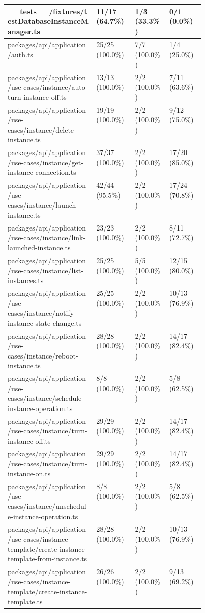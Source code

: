 \begin{longtable}{@{\extracolsep{\fill}}p{0.45\linewidth}lll}
\_\_tests\_\_/fixtures/testDatabaseInstanceManager.ts & 11/17 (64.7\%) & 1/3 (33.3\%) & 0/1 (0.0\%) \\ \hline
packages/api/application/auth.ts & 25/25 (100.0\%) & 7/7 (100.0\%) & 1/4 (25.0\%) \\ \hline
packages/api/application/use-cases/instance/auto-turn-instance-off.ts & 13/13 (100.0\%) & 2/2 (100.0\%) & 7/11 (63.6\%) \\ \hline
packages/api/application/use-cases/instance/delete-instance.ts & 19/19 (100.0\%) & 2/2 (100.0\%) & 9/12 (75.0\%) \\ \hline
packages/api/application/use-cases/instance/get-instance-connection.ts & 37/37 (100.0\%) & 2/2 (100.0\%) & 17/20 (85.0\%) \\ \hline
packages/api/application/use-cases/instance/launch-instance.ts & 42/44 (95.5\%) & 2/2 (100.0\%) & 17/24 (70.8\%) \\ \hline
packages/api/application/use-cases/instance/link-launched-instance.ts & 23/23 (100.0\%) & 2/2 (100.0\%) & 8/11 (72.7\%) \\ \hline
packages/api/application/use-cases/instance/list-instances.ts & 25/25 (100.0\%) & 5/5 (100.0\%) & 12/15 (80.0\%) \\ \hline
packages/api/application/use-cases/instance/notify-instance-state-change.ts & 25/25 (100.0\%) & 2/2 (100.0\%) & 10/13 (76.9\%) \\ \hline
packages/api/application/use-cases/instance/reboot-instance.ts & 28/28 (100.0\%) & 2/2 (100.0\%) & 14/17 (82.4\%) \\ \hline
packages/api/application/use-cases/instance/schedule-instance-operation.ts & 8/8 (100.0\%) & 2/2 (100.0\%) & 5/8 (62.5\%) \\ \hline
packages/api/application/use-cases/instance/turn-instance-off.ts & 29/29 (100.0\%) & 2/2 (100.0\%) & 14/17 (82.4\%) \\ \hline
packages/api/application/use-cases/instance/turn-instance-on.ts & 29/29 (100.0\%) & 2/2 (100.0\%) & 14/17 (82.4\%) \\ \hline
packages/api/application/use-cases/instance/unschedule-instance-operation.ts & 8/8 (100.0\%) & 2/2 (100.0\%) & 5/8 (62.5\%) \\ \hline
packages/api/application/use-cases/instance-template/create-instance-template-from-instance.ts & 28/28 (100.0\%) & 2/2 (100.0\%) & 10/13 (76.9\%) \\ \hline
packages/api/application/use-cases/instance-template/create-instance-template.ts & 26/26 (100.0\%) & 2/2 (100.0\%) & 9/13 (69.2\%) \\ \hline

\end{longtable}
